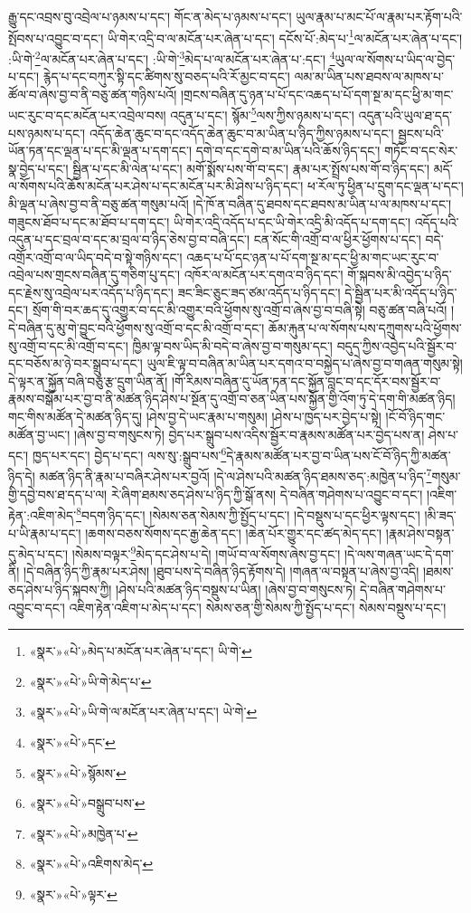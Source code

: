 རྒྱུ་དང་འབྲས་བུ་འབྲེལ་པ་ཉམས་པ་དང་། གོང་ན་མེད་པ་ཉམས་པ་དང་། ཡུལ་རྣམ་པ་མང་པོ་ལ་རྣམ་པར་རྟོག་པའི་སྤོབས་པ་འབྱུང་བ་དང་། ཡི་གེར་འདྲི་བ་ལ་མངོན་པར་ཞེན་པ་དང་། དངོས་པོ་:མེད་པ་\footnote{«སྣར་»«པེ་»མེད་པ་མངོན་པར་ཞེན་པ་དང་། ཡི་གེ་}ལ་མངོན་པར་ཞེན་པ་དང་། :ཡི་གེ་\footnote{«སྣར་»«པེ་»ཡི་གེ་མེད་པ་}ལ་མངོན་པར་ཞེན་པ་དང་། :ཡི་གེ་\footnote{«སྣར་»«པེ་»ཡི་གེ་ལ་མངོན་པར་ཞེན་པ་དང་། ཡེ་གེ་}མེད་པ་ལ་མངོན་པར་ཞེན་པ་:དང་། \footnote{«སྣར་»«པེ་»དང་}ཡུལ་ལ་སོགས་པ་ཡིད་ལ་བྱེད་པ་དང་། རྙེད་པ་དང་བཀུར་སྟི་དང་ཚིགས་སུ་བཅད་པའི་རོ་མྱང་བ་དང་། ལམ་མ་ཡིན་པས་ཐབས་ལ་མཁས་པ་ཚོལ་བ་ཞེས་བྱ་བ་ནི་བཅུ་ཚན་གཉིས་པའོ། །གྲངས་བཞིན་དུ་ཉན་པ་པོ་དང་འཆད་པ་པོ་དག་སྔ་མ་དང་ཕྱི་མ་གང་ཡང་རུང་བ་དང་མངོན་པར་འབྲེལ་བས། འདུན་པ་དང་། སྙོམ་\footnote{«སྣར་»«པེ་»སྙོམས་}ལས་ཀྱིས་ཉམས་པ་དང་། འདུན་པའི་ཡུལ་ཐ་དད་པས་ཉམས་པ་དང་། འདོད་ཆེན་ཆུང་བ་དང་འདོད་ཆེན་ཆུང་བ་མ་ཡིན་པ་ཉིད་ཀྱིས་ཉམས་པ་དང་། སྦྱངས་པའི་ཡོན་ཏན་དང་ལྡན་པ་དང་མི་ལྡན་པ་དག་དང་། དགེ་བ་དང་དགེ་བ་མ་ཡིན་པའི་ཆོས་ཉིད་དང་། གཏོང་བ་དང་སེར་སྣ་བྱེད་པ་དང་། སྦྱིན་པ་དང་མི་ལེན་པ་དང་། མགོ་སྨོས་པས་གོ་བ་དང་། རྣམ་པར་སྤྲོས་པས་གོ་བ་ཉིད་དང་། མདོ་ལ་སོགས་པའི་ཆོས་མངོན་པར་ཤེས་པ་དང་མངོན་པར་མི་ཤེས་པ་ཉིད་དང་། ཕ་རོལ་ཏུ་ཕྱིན་པ་དྲུག་དང་ལྡན་པ་དང་། མི་ལྡན་པ་ཞེས་བྱ་བ་ནི་བཅུ་ཚན་གསུམ་པའོ། །དེ་ཁོ་ན་བཞིན་དུ་ཐབས་དང་ཐབས་མ་ཡིན་པ་ལ་མཁས་པ་དང་། གཟུངས་ཐོབ་པ་དང་མ་ཐོབ་པ་དག་དང་། ཡི་གེར་འདྲི་འདོད་པ་དང་ཡི་གེར་འདྲི་མི་འདོད་པ་དག་དང་། འདོད་པའི་འདུན་པ་དང་བྲལ་བ་དང་མ་བྲལ་བ་ཉིད་ཅེས་བྱ་བ་བཞི་དང་། ངན་སོང་གི་འགྲོ་བ་ལ་ཕྱིར་ཕྱོགས་པ་དང་། བདེ་འགྲོར་འགྲོ་བ་ལ་ཡིད་བདེ་བ་སྟེ་གཉིས་དང་། འཆད་པ་པོ་དང་ཉན་པ་པོ་དག་སྔ་མ་དང་ཕྱི་མ་གང་ཡང་རུང་བ་འབྲེལ་པས་གྲངས་བཞིན་དུ་གཅིག་པུ་དང་། འཁོར་ལ་མངོན་པར་དགའ་བ་ཉིད་དང་། གོ་སྐབས་མི་འབྱེད་པ་ཉིད་དང་རྗེས་སུ་འབྲེལ་པར་འདོད་པ་ཉིད་དང་། ཟང་ཟིང་ཅུང་ཟད་ཙམ་འདོད་པ་ཉིད་དང་། དེ་སྦྱིན་པར་མི་འདོད་པ་ཉིད་དང་། སྲོག་གི་བར་ཆད་དུ་འགྱུར་བ་དང་མི་འགྱུར་བའི་ཕྱོགས་སུ་འགྲོ་བ་ཞེས་བྱ་བ་བཞི་སྟེ། བཅུ་ཚན་བཞི་པའོ། །དེ་བཞིན་དུ་མུ་གེ་བྱུང་བའི་ཕྱོགས་སུ་འགྲོ་བ་དང་མི་འགྲོ་བ་དང་། ཆོམ་རྐུན་པ་ལ་སོགས་པས་དཀྲུགས་པའི་ཕྱོགས་སུ་འགྲོ་བ་དང་མི་འགྲོ་བ་དང་། ཁྱིམ་ལྟ་བས་ཡིད་མི་བདེ་བ་ཞེས་བྱ་བ་གསུམ་དང་། བདུད་ཀྱིས་འབྱེད་པའི་སྦྱོར་བ་དང་བཅོས་མ་ཉེ་བར་སྒྲུབ་པ་དང་། ཡུལ་ཇི་ལྟ་བ་བཞིན་མ་ཡིན་པར་དགའ་བ་བསྐྱེད་པ་ཞེས་བྱ་བ་གཞན་གསུམ་སྟེ། དེ་ལྟར་ན་སྐྱོན་བཞི་བཅུ་རྩ་དྲུག་ཡིན་ནོ། །གོ་རིམས་བཞིན་དུ་ཡོན་ཏན་དང་སྐྱོན་བླང་བ་དང་དོར་བས་སྦྱོར་བ་རྣམས་བསྒོམ་པར་བྱ་བ་ནི་མཚན་ཉིད་ཤེས་པ་སྔོན་དུ་འགྲོ་བ་ཅན་ཡིན་པས་སྐྱོན་གྱི་འོག་ཏུ་དེ་དག་གི་མཚན་ཉིད། གང་གིས་མཚོན་དེ་མཚན་ཉིད་དུ། །ཤེས་བྱ་དེ་ཡང་རྣམ་པ་གསུམ། །ཤེས་པ་ཁྱད་པར་བྱེད་པ་སྟེ། །ངོ་བོ་ཉིད་གང་མཚོན་བྱ་ཡང་། །ཞེས་བྱ་བ་གསུངས་ཏེ། བྱེད་པར་སྒྲུབ་པས་འདིས་སྦྱོར་བ་རྣམས་མཚོན་པར་བྱེད་པས་ན། ཤེས་པ་དང་། ཁྱད་པར་དང་། བྱེད་པ་དང་། ལས་སུ་:སྒྲུབ་པས་\footnote{«སྣར་»«པེ་»བསྒྲུབ་པས་}དེ་རྣམས་མཚོན་པར་བྱ་བ་ཡིན་པས་ངོ་བོ་ཉིད་ཀྱི་མཚན་ཉིད་དེ། མཚན་ཉིད་ནི་རྣམ་པ་བཞིར་ཤེས་པར་བྱའོ། །དེ་ལ་ཤེས་པའི་མཚན་ཉིད་ཐམས་ཅད་:མཁྱེན་པ་ཉིད་\footnote{«སྣར་»«པེ་»མཁྱེན་པ་}གསུམ་གྱི་དབྱེ་བས་ཐ་དད་པ་ལ། རེ་ཞིག་ཐམས་ཅད་ཤེས་པ་ཉིད་ཀྱི་སྒོ་ནས། དེ་བཞིན་གཤེགས་པ་འབྱུང་བ་དང་། །འཇིག་རྟེན་:འཇིག་མེད་\footnote{«སྣར་»«པེ་»འཇིགས་མེད་}བདག་ཉིད་དང་། །སེམས་ཅན་སེམས་ཀྱི་སྤྱོད་པ་དང་། །དེ་བསྡུས་པ་དང་ཕྱིར་ལྟས་དང་། །མི་ཟད་པ་ཡི་རྣམ་པ་དང་། །ཆགས་བཅས་སོགས་དང་རྒྱ་ཆེན་དང་། །ཆེན་པོར་གྱུར་དང་ཚད་མེད་དང་། །རྣམ་ཤེས་བསྟན་དུ་མེད་པ་དང་། །སེམས་བལྟར་\footnote{«སྣར་»«པེ་»ལྟར་}མེད་དང་ཤེས་པ་དེ། །གཡོ་བ་ལ་སོགས་ཞེས་བྱ་དང་། །དེ་ལས་གཞན་ཡང་དེ་དག་ནི། །དེ་བཞིན་ཉིད་ཀྱི་རྣམ་པར་ཤེས། །ཐུབ་པས་དེ་བཞིན་ཉིད་རྟོགས་དེ། །གཞན་ལ་བསྟན་པ་ཞེས་བྱ་འདི། །ཐམས་ཅད་ཤེས་པ་ཉིད་སྐབས་ཀྱི། །ཤེས་པའི་མཚན་ཉིད་བསྡུས་པ་ཡིན། །ཞེས་བྱ་བ་གསུངས་ཏེ། དེ་བཞིན་གཤེགས་པ་འབྱུང་བ་དང་། འཇིག་རྟེན་འཇིག་པ་མེད་པ་དང་། སེམས་ཅན་གྱི་སེམས་ཀྱི་སྤྱོད་པ་དང་། སེམས་བསྡུས་པ་དང་། 